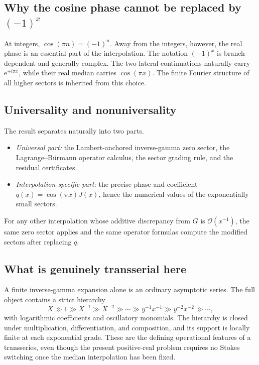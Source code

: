 \documentclass[11pt,oneside]{article}
\theoremstyle{plain}
\theoremstyle{definition}
\theoremstyle{remark}
\newcommand{\ee}{\mathrm{e}}
\newcommand{\bigO}{\mathcal{O}}
\begin{document}
\subsection{Why the cosine phase cannot be replaced by \texorpdfstring{\((-1)^x\)}{(-1) raised to x}}

At integers, \(\cos(\pi n)=(-1)^n\).  Away from the integers, however, the
real phase is an essential part of the interpolation.  The notation
\((-1)^x\) is branch-dependent and generally complex.  The two lateral
continuations naturally carry \(\ee^{\pm i\pi x}\), while their real median
carries \(\cos(\pi x)\).  The finite Fourier structure of all higher sectors
is inherited from this choice.

\subsection{Universality and nonuniversality}

The result separates naturally into two parts.
\begin{itemize}
\item \emph{Universal part:} the Lambert-anchored inverse-gamma zero sector,
the Lagrange--B\"urmann operator calculus, the sector grading rule, and the
residual certificates.
\item \emph{Interpolation-specific part:} the precise phase and coefficient
\(q(x)=\cos(\pi x)J(x)\), hence the numerical values of the exponentially small
sectors.
\end{itemize}
For any other interpolation whose additive discrepancy from \(G\) is
\(\bigO(x^{-1})\), the same zero sector applies and the same operator formulas
compute the modified sectors after replacing \(q\).

\subsection{What is genuinely transserial here}

A finite inverse-gamma expansion alone is an ordinary asymptotic series.  The
full object contains a strict hierarchy
\begin{equation}
 X\gg1\gg X^{-1}\gg X^{-2}\gg\cdots
 \gg y^{-1}x^{-1}\gg y^{-2}x^{-2}\gg\cdots,
 \label{eq:hierarchy-display}
\end{equation}
with logarithmic coefficients and oscillatory monomials.  The hierarchy is
closed under multiplication, differentiation, and composition, and its
support is locally finite at each exponential grade.  These are the defining
operational features of a transseries, even though the present positive-real
problem requires no Stokes switching once the median interpolation has been
fixed.
\end{document}
